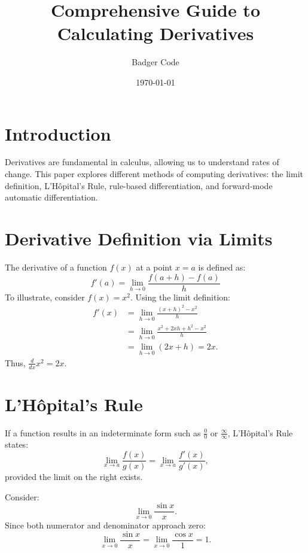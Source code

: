 \documentclass[a4paper,12pt]{article}
\title{\textbf{Comprehensive Guide to Calculating Derivatives}}
\author{Badger Code}
\date{\today}
\begin{document}
\maketitle

\section{Introduction}
Derivatives are fundamental in calculus, allowing us to understand rates of change. This paper explores different methods of computing derivatives: the limit definition, L'Hôpital's Rule, rule-based differentiation, and forward-mode automatic differentiation.

\section{Derivative Definition via Limits}
The derivative of a function $f(x)$ at a point $x=a$ is defined as:
\begin{equation}
	f'(a) = \lim_{h \to 0} \frac{f(a+h) - f(a)}{h}
\end{equation}
To illustrate, consider $f(x) = x^2$. Using the limit definition:
\begin{align*}
	f'(x) &= \lim_{h \to 0} \frac{(x+h)^2 - x^2}{h} \\
	&= \lim_{h \to 0} \frac{x^2 + 2xh + h^2 - x^2}{h} \\
	&= \lim_{h \to 0} (2x + h) = 2x.
\end{align*}
Thus, $\frac{d}{dx} x^2 = 2x$.

\section{L'Hôpital's Rule}
If a function results in an indeterminate form such as $\frac{0}{0}$ or $\frac{\infty}{\infty}$, L'Hôpital's Rule states:
\begin{equation}
	\lim_{x \to a} \frac{f(x)}{g(x)} = \lim_{x \to a} \frac{f'(x)}{g'(x)},
\end{equation}
provided the limit on the right exists.

Consider:
\begin{equation}
	\lim_{x \to 0} \frac{\sin x}{x}.
\end{equation}
Since both numerator and denominator approach zero:
\begin{equation}
	\lim_{x \to 0} \frac{\sin x}{x} = \lim_{x \to 0} \frac{\cos x}{1} = 1.
\end{equation}
\end{document}
